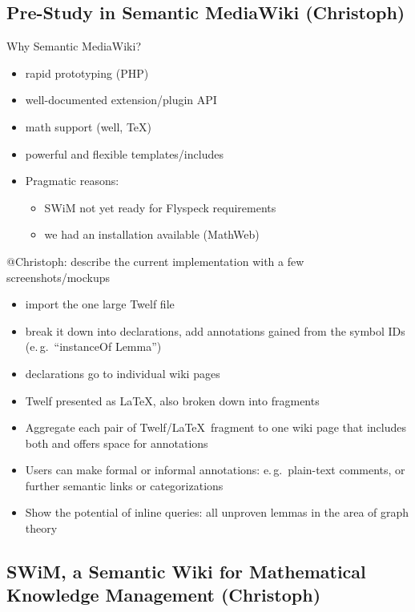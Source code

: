 \documentclass{llncs}
\begin{document}
\subsection{Pre-Study in Semantic MediaWiki (Christoph)}
\label{sec:smw-study}

Why Semantic MediaWiki\cite{KrSchVr:semwiki-reasoning07}?
\begin{itemize}
\item rapid prototyping (PHP)
\item well-documented extension/plugin API
\item math support (well, \TeX)
\item powerful and flexible templates/includes
\item Pragmatic reasons:
  \begin{itemize}
  \item SWiM not yet ready for Flyspeck requirements
  \item we had an installation available (MathWeb)
  \end{itemize}
\end{itemize}

\begin{todo}{@Christoph: describe the current implementation with a few
    screenshots/mockups}
  \begin{itemize}
  \item import the one large Twelf file
  \item break it down into declarations, add annotations gained from the symbol IDs
    (e.\,g.\ ``instanceOf Lemma'')
  \item declarations go to individual wiki pages
  \item Twelf presented as \LaTeX, also broken down into fragments
  \item Aggregate each pair of Twelf/\LaTeX\ fragment to one wiki page that includes both
    and offers space for annotations
  \item Users can make formal or informal annotations: e.\,g.\ plain-text comments, or
    further semantic links or categorizations
  \item Show the potential of inline queries: all unproven lemmas in the area of graph
    theory
  \end{itemize}
\end{todo}

\subsection{SWiM, a Semantic Wiki for Mathematical Knowledge Management (Christoph)}
\label{sec:swim}
\end{document}
